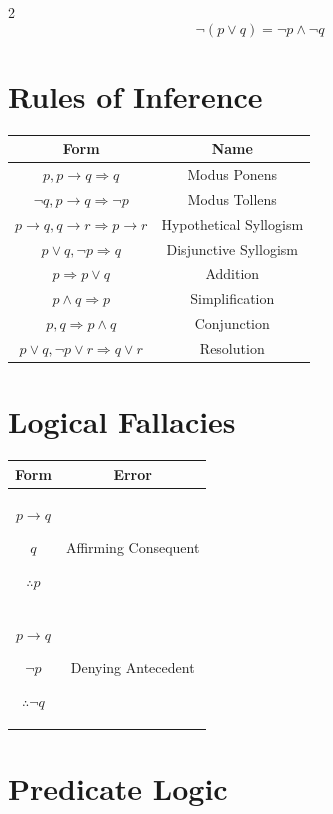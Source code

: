 \documentclass[9pt]{article}
\begin{document}
\begin{multicols}{2}
\[
\neg(p\lor q)=\neg p\land\neg q
\]

\section*{Rules of Inference}

\begin{tabular}{|c|c|}
\hline
Form & Name\\
\hline
$p, p\rightarrow q \Rightarrow q$ & Modus Ponens\\
\hline
$\neg q, p\rightarrow q \Rightarrow \neg p$ & Modus Tollens\\
\hline
$p\rightarrow q, q\rightarrow r \Rightarrow p\rightarrow r$ & Hypothetical Syllogism\\
\hline
$p\lor q, \neg p \Rightarrow q$ & Disjunctive Syllogism\\
\hline
$p \Rightarrow p\lor q$ & Addition\\
\hline
$p\land q \Rightarrow p$ & Simplification\\
\hline
$p,q \Rightarrow p\land q$ & Conjunction\\
\hline
$p\lor q,\neg p\lor r \Rightarrow q\lor r$ & Resolution\\
\hline
\end{tabular}

\section*{Logical Fallacies}

\begin{tabular}{|c|c|}
\hline
Form & Error\\
\hline
$p\rightarrow q$

$q$

$\therefore p$
& Affirming Consequent\\
\hline

$p\rightarrow q$

$\neg p$

$\therefore \neg q$
& Denying Antecedent\\
\hline
\end{tabular}

\section*{Predicate Logic}


\end{multicols}
\end{document}
